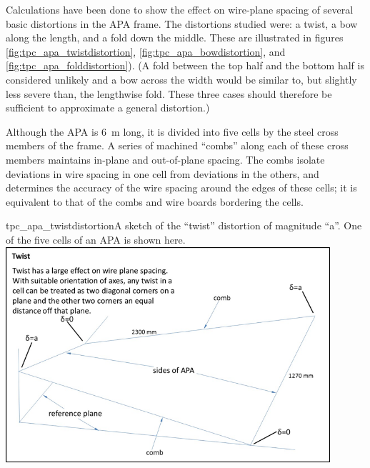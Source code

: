 Calculations have been done to show the effect on wire-plane spacing of several basic distortions in the APA frame.  The distortions studied were: a twist, a bow along the length, and a fold down the middle. These are illustrated in figures \ref{fig:tpc_apa_twistdistortion}, \ref{fig:tpc_apa_bowdistortion}, and \ref{fig:tpc_apa_folddistortion}).  (A fold between the top half and the bottom half is considered unlikely and a bow across the width would be similar to, but slightly less severe than, the lengthwise fold. These three cases should therefore be %
sufficient to approximate a general distortion.)

Although the APA is 6~m long, it is divided into five cells by the steel cross members of the frame.  A series of machined ``combs'' along each of these cross members maintains in-plane and out-of-plane spacing.  The combs isolate deviations in wire spacing in one cell from deviations in the others, and %
determines the accuracy of the wire spacing around the edges of these cells; it is equivalent to that of the combs and wire boards bordering the cells.  %

\begin{cdrfigure}{tpc_apa_twistdistortion}{A sketch of the ``twist'' distortion of magnitude ``a''.  One of the five cells of an APA is shown here.}
\includegraphics[width=0.9\textwidth]{figures/tpc_apa_twistdistortion.png} 
\end{cdrfigure}

